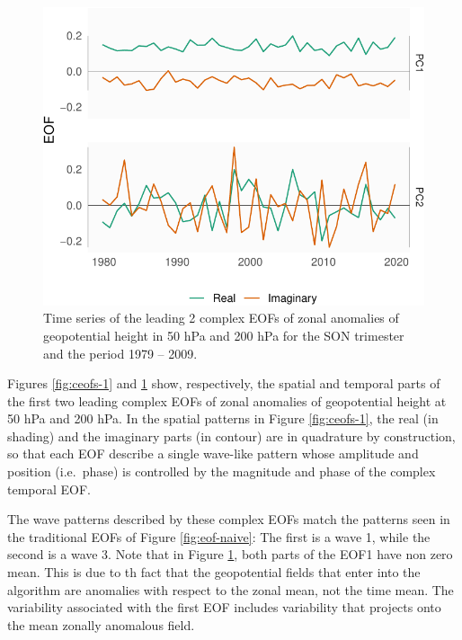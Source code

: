 \documentclass[smallextended]{svjour3}       %
\begin{document}
\begin{figure}
\centering
\includegraphics{../figures/ceofs-2-1.pdf}
\caption{\label{fig:ceofs-2}Time series of the leading 2 complex EOFs of zonal anomalies of geopotential height in 50 hPa and 200 hPa for the SON trimester and the period 1979 -- 2009.}
\end{figure}

Figures \ref{fig:ceofs-1} and \ref{fig:ceofs-2} show, respectively, the spatial and temporal parts of the first two leading complex EOFs of zonal anomalies of geopotential height at 50 hPa and 200 hPa. In the spatial patterns in Figure \ref{fig:ceofs-1}, the real (in shading) and the imaginary parts (in contour) are in quadrature by construction, so that each EOF describe a single wave-like pattern whose amplitude and position (i.e.~phase) is controlled by the magnitude and phase of the complex temporal EOF.

The wave patterns described by these complex EOFs match the patterns seen in the traditional EOFs of Figure \ref{fig:eof-naive}: The first is a wave 1, while the second is a wave 3. Note that in Figure \ref{fig:ceofs-2}, both parts of the EOF1 have non zero mean. This is due to th fact that the geopotential fields that enter into the algorithm are anomalies with respect to the zonal mean, not the time mean. The variability associated with the first EOF includes variability that projects onto the mean zonally anomalous field.
\end{document}
